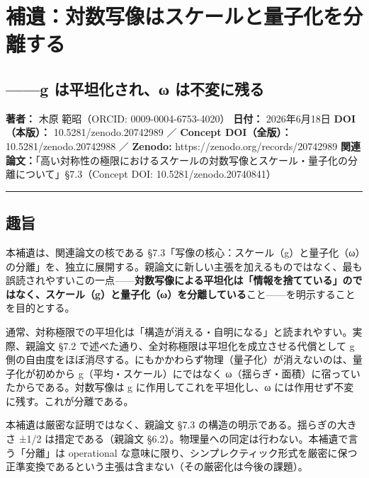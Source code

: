 \documentclass[11pt]{ltjsarticle}
\begin{document}
\section{補遺：対数写像はスケールと量子化を分離する}\label{ux88dcux907aux5bfeux6570ux5199ux50cfux306fux30b9ux30b1ux30fcux30ebux3068ux91cfux5b50ux5316ux3092ux5206ux96e2ux3059ux308b}

\subsection{------g は平坦化され、ω
は不変に残る}\label{g-ux306fux5e73ux5766ux5316ux3055ux308cux3c9-ux306fux4e0dux5909ux306bux6b8bux308b}

\textbf{著者：} 木原 範昭（ORCID: 0009-0004-6753-4020） \textbf{日付：}
2026年6月18日 \textbf{DOI（本版）：} 10.5281/zenodo.20742989 ／
\textbf{Concept DOI（全版）：} 10.5281/zenodo.20742988 ／
\textbf{Zenodo:} https://zenodo.org/records/20742989
\textbf{関連論文：}「高い対称性の極限におけるスケールの対数写像とスケール・量子化の分離について」§7.3（Concept
DOI: 10.5281/zenodo.20740841）

\begin{center}\rule{0.5\linewidth}{0.5pt}\end{center}

\subsection{趣旨}\label{ux8da3ux65e8}

本補遺は、関連論文の核である
§7.3「写像の核心：スケール（g）と量子化（ω）の分離」を、独立に展開する。親論文に新しい主張を加えるものではなく、最も誤読されやすいこの一点------\textbf{対数写像による平坦化は「情報を捨てている」のではなく、スケール（g）と量子化（ω）を分離している}こと------を明示することを目的とする。

通常、対称極限での平坦化は「構造が消える・自明になる」と読まれやすい。実際、親論文
§7.2 で述べた通り、全対称極限は平坦化を成立させる代償として g
側の自由度をほぼ消尽する。にもかかわらず物理（量子化）が消えないのは、量子化が初めから
g（平均・スケール）にではなく
ω（揺らぎ・面積）に宿っていたからである。対数写像は g
に作用してこれを平坦化し、ω には作用せず不変に残す。これが分離である。

本補遺は厳密な証明ではなく、親論文 §7.3
の構造の明示である。揺らぎの大きさ ±1/2 は措定である（親論文
§6.2）。物理量への同定は行わない。本補遺で言う「分離」は operational
な意味に限り、シンプレクティック形式を厳密に保つ正準変換であるという主張は含まない（その厳密化は今後の課題）。
\end{document}
